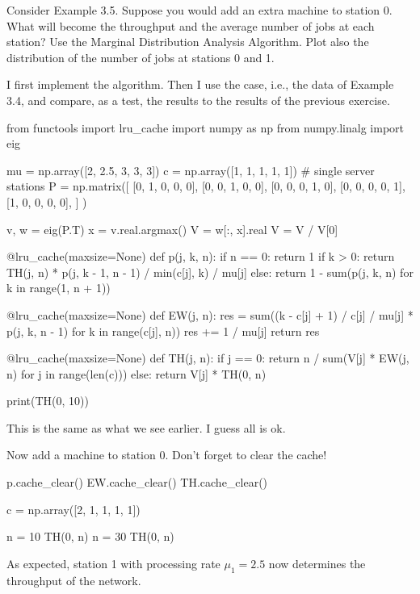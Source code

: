 \begin{exercise}
 Consider Example 3.5. Suppose you would add an extra machine to
 station 0. What will become the throughput and the average number of
 jobs at each station? Use the Marginal Distribution Analysis
 Algorithm. Plot also the distribution of the number of jobs at
 stations 0 and 1.
\begin{solution}
 I first implement the algorithm. Then I use the case, i.e., the
 data of Example 3.4, and compare, as a test, the results to the
 results of the previous exercise.

\begin{pyconsole}
from functools import lru_cache
import numpy as np
from numpy.linalg import eig

mu = np.array([2, 2.5, 3, 3, 3])
c = np.array([1, 1, 1, 1, 1]) # single server stations
P = np.matrix([
 [0, 1, 0, 0, 0],
 [0, 0, 1, 0, 0],
 [0, 0, 0, 1, 0],
 [0, 0, 0, 0, 1],
 [1, 0, 0, 0, 0],
]
)

v, w = eig(P.T)
x = v.real.argmax()
V = w[:, x].real
V = V / V[0]


@lru_cache(maxsize=None)
def p(j, k, n):
 if n == 0:
 return 1
 if k > 0:
 return TH(j, n) * p(j, k - 1, n - 1) / min(c[j], k) / mu[j]
 else:
 return 1 - sum(p(j, k, n) for k in range(1, n + 1))


@lru_cache(maxsize=None)
def EW(j, n):
 res = sum((k - c[j] + 1) / c[j] / mu[j] * p(j, k, n - 1)
 for k in range(c[j], n))
 res += 1 / mu[j]
 return res


@lru_cache(maxsize=None)
def TH(j, n):
 if j == 0:
 return n / sum(V[j] * EW(j, n) for j in range(len(c)))
 else:
 return V[j] * TH(0, n)

print(TH(0, 10))
 
\end{pyconsole}

This is the same as what we see earlier. I guess all is ok. 

Now add a machine to station 0. Don't forget to clear the cache!

\begin{pyconsole}
p.cache_clear()
EW.cache_clear()
TH.cache_clear()

c = np.array([2, 1, 1, 1, 1])

n = 10
TH(0, n)
n = 30
TH(0, n)
 
\end{pyconsole}

As expected, station 1 with processing rate $\mu_1=2.5$ now determines
the throughput of the network.



\end{solution}
\end{exercise}
